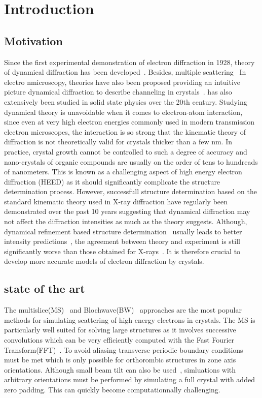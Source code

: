 
\section{Introduction}

\subsection{Motivation}
Since the first experimental demonstration of electron diffraction in 1928,
theory of dynamical diffraction has been developed~\cite{Bethe1928,CowleyBook}.
Besides, multiple scattering~\cite{Korringa1947,Kohn1954,Korringa1994,Dederichs1971}
In electro nmicroscopy, theories have also been proposed providing an intuitive picture
dynamical diffraction to describe channeling in crystals~\cite{VanDyck1995}.
has also extensively been studied in solid state physics over the 20th century.
Studying dynamical theory is unavoidable when it comes to electron-atom interaction,
since even at very high electron energies commonly used in modern transmission
electron microscopes, the interaction is so strong that the kinematic
theory of diffraction is not theoretically valid for crystals thicker than a
few nm\cite{GlaeserDowning1993,SubramanianSpence2015}. In practice, crystal
growth cannot be controlled to such a degree of accuracy and nano-crystals
of organic compounds are usually on the order of tens to hundreads of nanometers.
This is known as a challenging aspect of high energy electron diffraction (HEED) as it
should significantly complicate the structure determination process.
However, successfull structure determination based on the standard kinematic
theory used in X-ray diffraction have regularly been demonstrated over the
past 10 years\cite{Nannenga2014,Nannenga2019} suggesting that dynamical diffraction may
not affect the diffraction intensities as much as the theory suggests.
Although, dynamical refinement based structure determination~\cite{Palatinus2013} usually
leads to better intensity predictions~\cite{Gemmi2019b}, the agreement
between theory and experiment is still significantly worse than those obtained
for X-rays~\cite{Oleynikov2007}. It is therefore crucial to develop more
accurate models of electron diffraction by crystals.

\subsection{state of the art}
The multislice(MS)~\cite{CowleyMoodie1957} and Blochwave(BW)~\cite{Bethe1928}
approaches are the most popular methods for simulating scattering of high energy
electrons in crystals.
The MS is particularly well suited for solving large structures as it involves
successive convolutions which can be very efficiently computed with the Fast
Fourier Transform(FFT)~\cite{Ishizuka1977}. To avoid aliasing transverse periodic
boundary conditions must be met which is only possible for orthorombic
structures in zone axis orientations. Although small beam tilt can also be
used~\cite{Ishizuka1982,ChenDyck1997}, simluations with arbitrary orientations
must be performed by simulating a full crystal with added zero padding. This
can quickly become computationnally challenging.

